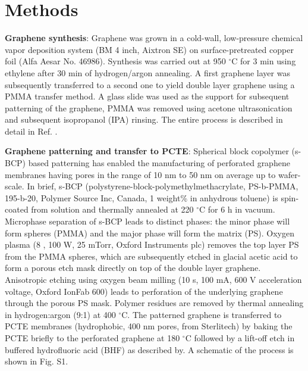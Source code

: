 \documentclass[journal=langd5,email=true, hyperref=true, keywords=false]{achemso}
\begin{document}
\section*{Methods}
\label{sec:methods}

\textbf{Graphene synthesis}: Graphene was grown in a cold-wall,
low-pressure chemical vapor deposition system (BM 4 inch, Aixtron SE)
on surface-pretreated copper foil (Alfa Aesar No. 46986). Synthesis was
carried out at 950 $^{\circ}$C for 3 min using ethylene after 30 min of
hydrogen/argon annealing. A first graphene layer was subsequently
transferred to a second one to yield double layer graphene using a
PMMA transfer method. A glass slide was used as the support for
subsequent patterning of the graphene, PMMA was removed using acetone
ultrasonication and subsequent isopropanol (IPA) rinsing. The entire
process is described in detail in Ref. .

\vspace{1em}
\noindent
\textbf{Graphene patterning and transfer to PCTE}: Spherical block
copolymer (s-BCP) based patterning has enabled the manufacturing of
perforated graphene membranes having pores in the range of 10 nm to 50
nm on average up to wafer-scale\cite{Choi_2018}. In brief, s-BCP
(polystyrene-block-polymethylmethacrylate, PS-b-PMMA, 195-b-20,
Polymer Source Inc, Canada, 1 weight\% in anhydrous toluene) is
spin-coated from solution and thermally annealed at 220 $^{\circ}$C
for 6 h in vacuum. Microphase separation of s-BCP leads to distinct
phases: the minor phase will form spheres (PMMA) and the major phase
will form the matrix (PS). Oxygen plasma (8 , 100 W, 25 mTorr, Oxford
Instruments plc) removes the top layer PS from the PMMA spheres, which
are subsequently etched in glacial acetic acid to form a porous
etch mask directly on top of the double layer graphene. Anisotropic
etching using oxygen beam milling (10 s, 100 mA, 600 V acceleration
voltage, Oxford IonFab 600) leads to perforation of the underlying
graphene through the porous PS mask. Polymer residues are removed by
thermal annealing in hydrogen:argon (9:1) at 400 $^{\circ}$C. The
patterned graphene is transferred to PCTE membranes (hydrophobic, 400
nm pores, from Sterlitech) by baking the PCTE briefly to the
perforated graphene at 180 $^{\circ}$C followed by a lift-off etch in
buffered hydrofluoric acid (BHF) as described by\cite{Choi_2018}. A
schematic of the process is shown in Fig. S1.
\end{document}
